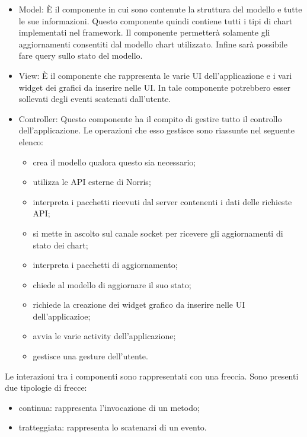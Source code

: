     	\begin{itemize}
            \item{Model:} 
        		È il componente in cui sono contenute la struttura del modello e tutte le sue informazioni. Questo componente quindi contiene tutti i tipi di chart implementati nel framework. Il componente permetterà solamente gli aggiornamenti consentiti dal modello chart utilizzato. Infine sarà possibile fare query sullo stato del modello.
        	\item{View:}
        		È il componente che rappresenta le varie UI dell'applicazione e i vari widget dei grafici da inserire nelle UI. In tale componente potrebbero esser sollevati degli eventi scatenati dall'utente.
        	\item{Controller:}
        		Questo componente ha il compito di gestire tutto il controllo dell'applicazione. Le operazioni che esso gestisce sono riassunte nel seguente elenco:
        		\begin{itemize}
        			\item crea il modello qualora questo sia necessario;
        			\item utilizza le API esterne di Norris;
        			\item interpreta i pacchetti ricevuti dal server contenenti i dati delle richieste API;
        			\item si mette in ascolto sul canale socket per ricevere gli aggiornamenti di stato dei chart;
        			\item interpreta i pacchetti di aggiornamento;
        			\item chiede al modello di aggiornare il suo stato;
        			\item richiede la creazione dei widget grafico da inserire nelle UI dell'applicazioe;
        			\item avvia le varie activity dell'applicazione;
        			\item gestisce una gesture dell'utente.
        		\end{itemize}
        \end{itemize}
    	Le interazioni tra i componenti sono rappresentati con una freccia. Sono presenti due tipologie di frecce:
    	\begin{itemize}
    			\item{continua: } rappresenta l'invocazione di un metodo;
    			\item{tratteggiata: } rappresenta lo scatenarsi di un evento.
    		\end{itemize}
